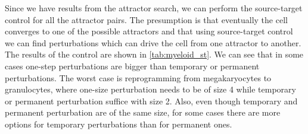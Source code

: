 Since we have results from the attractor search, we can perform the source-target control for all the attractor pairs. The presumption is that eventually the cell converges to one of the possible attractors and that using source-target control we can find perturbations which can drive the cell from one attractor to another. The results of the control are shown in \autoref{tab:myeloid_st}. We can see that in some cases one-step perturbations are bigger than temporary or permanent perturbations. The worst case is reprogramming from megakaryocytes to granulocytes, where one-size perturbation needs to be of size 4 while temporary or permanent perturbation suffice with size 2. Also, even though temporary and permanent perturbation are of the same size, for some cases there are more options for temporary perturbations than for permanent ones.


